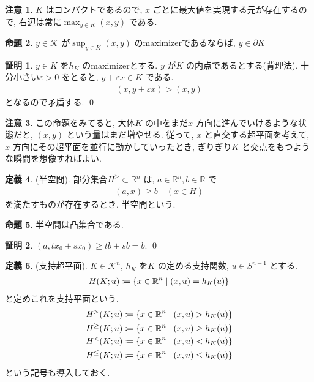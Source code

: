\documentclass[10pt, fleqn, label-section=none]{bxjsarticle}
\theoremstyle{definition}
\newtheorem{dfn}{定義}[section]
\newtheorem{prop}[dfn]{命題}
\newtheorem*{pf*}{証明}
\newtheorem{remark}[dfn]{注意}
\newcommand{\veps}{\varepsilon}
\newcommand{\cbra}[1]{\mleft\{#1\mright\}}
\renewcommand{\;}{\, ; \,}
\begin{document}
\begin{remark}
$K$ はコンパクトであるので, $x$ ごとに最大値を実現する元が存在するので, 右辺は常に$\max_{y \in K}(x, y)$ である. 
\end{remark}

\begin{prop}$y \in \mathcal K$ が$\sup_{y \in K}(x, y)$ のmaximizerであるならば, $y \in \partial K$
\end{prop}
\begin{pf*}
$y \in K$ を$h_K$ のmaximizerとする. $y$ が$K$ の内点であるとする(背理法). 十分小さい$\veps > 0$ をとると, $y + \veps x \in K$ である. 
\begin{align*} (x, y + \veps x) > (x, y)  \end{align*}
となるので矛盾する. 
\qed
\end{pf*}

\begin{remark}この命題をみてると, 大体$K$ の中をまだ$x$ 方向に進んでいけるような状態だと, $(x, y)$ という量はまだ増やせる. 従って, $x$ と直交する超平面を考えて, $x$ 方向にその超平面を並行に動かしていったとき, ぎりぎり$K$ と交点をもつような瞬間を想像すればよい. 

\end{remark}




\begin{dfn}(半空間). 部分集合$H^{\geq} \subset \mathbb R^n$ は, $a \in \mathbb R^n, b \in \mathbb R$ で
\begin{align*} (a, x) \geq b \quad (x \in H)\end{align*} 
を満たすものが存在するとき, 半空間という. 
\end{dfn}

\begin{prop}半空間は凸集合である.

\end{prop}
\begin{pf*}
$(a, tx_0 + s x_0) \geq tb + sb = b.$
\qed
\end{pf*}

\begin{dfn}(支持超平面). $K \in \mathcal K^n$, $h_K$ を$K$ の定める支持関数, $u \in S^{n-1}$ とする. 
\begin{align*} H(K; u) \coloneqq \cbra{x \in \mathbb R^n \mid (x, u) = h_K (u) } \end{align*}
と定めこれを支持平面という. 
\begin{align*}  &H^{>} (K; u) \coloneqq \cbra{x \in \mathbb R^n \mid (x, u) > h_K (u) }  \\
&H^{\geq} (K; u) \coloneqq \cbra{x \in \mathbb R^n \mid (x, u) \geq h_K (u) } \\
&H^{<} (K; u) \coloneqq \cbra{x \in \mathbb R^n \mid (x, u) < h_K (u) } \\
&H^{\leq} (K; u) \coloneqq \cbra{x \in \mathbb R^n \mid (x, u) \leq h_K (u) } 
  \end{align*}
という記号も導入しておく. 
\end{dfn}
\end{document}
